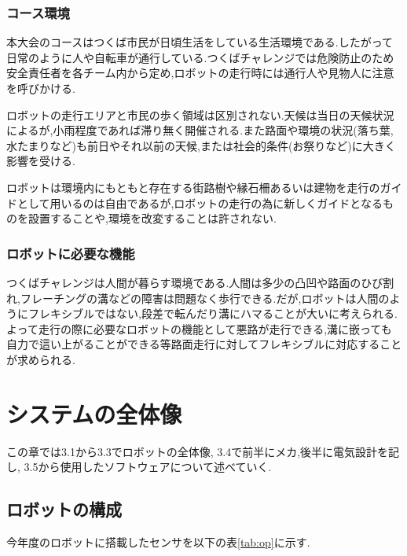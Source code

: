 \documentclass[12pt,oneside]{sotsuken_paper}
\begin{document}
\subsection{コース環境}
本大会のコースはつくば市民が日頃生活をしている生活環境である.したがって日常のように人や自転車が通行している.つくばチャレンジでは危険防止のため安全責任者を各チーム内から定め,ロボットの走行時には通行人や見物人に注意を呼びかける.


ロボットの走行エリアと市民の歩く領域は区別されない.天候は当日の天候状況によるが,小雨程度であれば滞り無く開催される.また路面や環境の状況(落ち葉,水たまりなど)も前日やそれ以前の天候,または社会的条件(お祭りなど)に大きく影響を受ける.


ロボットは環境内にもともと存在する街路樹や縁石柵あるいは建物を走行のガイドとして用いるのは自由であるが,ロボットの走行の為に新しくガイドとなるものを設置することや,環境を改変することは許されない.

\subsection{ロボットに必要な機能}
つくばチャレンジは人間が暮らす環境である.人間は多少の凸凹や路面のひび割れ,フレーチングの溝などの障害は問題なく歩行できる.だが,ロボットは人間のようにフレキシブルではない,段差で転んだり溝にハマることが大いに考えられる.よって走行の際に必要なロボットの機能として悪路が走行できる,溝に嵌っても自力で這い上がることができる等路面走行に対してフレキシブルに対応することが求められる.



\chapter{システムの全体像}
この章では3.1から3.3でロボットの全体像, 3.4で前半にメカ,後半に電気設計を記し, 3.5から使用したソフトウェアについて述べていく.
\section{ロボットの構成}
今年度のロボットに搭載したセンサを以下の表\ref{tab:op}に示す.

\begin{table}[h]
 　\begin{center}
    \caption{ハードウェアの構成}
    \small
　   \label{tab:op}
  \end{center}
\end{table}
\end{document}
